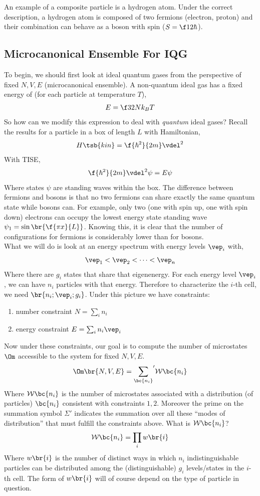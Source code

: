 \documentclass{article}
\begin{document}
{An example of a composite particle is a hydrogen atom. Under the correct description, a hydrogen atom is composed of two fermions (electron, proton) and their combination can behave as a boson with spin ($S = \f12 \hbar$).

\subsection{Microcanonical Ensemble For IQG}
To begin, we should first look at ideal quantum gases from the perspective of fixed $N, V, E$ (microcanonical ensemble). A non-quantum ideal gas has a fixed energy of (for each particle at temperature $T$),
\[ E = \f32 N k_B T \]
So how can we modify this expression to deal with \textit{quantum} ideal gases? Recall the results for a particle in a box of length $L$ with Hamiltonian,
\[ H\tsb{kin} = \f{\hbar^2}{2m} \vdel^2 \]
With TISE,
\[ \f{\hbar^2}{2m} \vdel^2 \psi = E \psi \]
Where states $\psi$ are standing waves within the box. The difference between fermions and bosons is that no two fermions can share exactly the same quantum state while bosons can. For example, only two (one with spin up, one with spin down) electrons can occupy the lowest energy state standing wave $\psi_1 = \sin \br{\f{\pi x}{L}}$. Knowing this, it is clear that the number of configurations for fermions is considerably lower than for bosons. \\

What we will do is look at an energy spectrum with energy levels $\vep_i$ with,
\[ \vep_1 < \vep_2 < \cdots < \vep_n \]
Where there are $g_i$ states that share that eigenenergy. For each energy level $\vep_i$, we can have $n_i$ particles with that energy. Therefore to characterize the $i$-th cell, we need $\br{n_i; \vep_i; g_i}$. Under this picture we have constraints:
\begin{enumerate}
    \item number constraint $N = \sum_i n_i$
    \item energy constraint $E = \sum_i n_i \vep_i$
\end{enumerate}
Now under these constraints, our goal is to compute the number of microstates $\Om$ accessible to the system for fixed $N, V, E$.
\[ \Om\br{N,V,E} = {\sum_{\bc{n_i}}}' \mathcal{W} \bc{n_i} \]
Where $\mathcal{W}\bc{n_i}$ is the number of microstates associated with a distribution (of particles) $\bc{n_i}$ consistent with constraints $1,2$. Moreover the prime on the summation symbol $\Sigma'$ indicates the summation over all these ``modes of distribution'' that must fulfill the constraints above. What is $\mathcal{W}\bc{n_i}$?
\[ \mathcal{W}\bc{n_i} = \prod_{i} w \br{i} \]
Where $w \br{i}$ is the number of distinct ways in which $n_i$ indistinguishable particles can be distributed among the (distinguishable) $g_i$ levels/states in the $i$-th cell. The form of $w\br{i}$ will of course depend on the type of particle in question.\\

}
\end{document}
